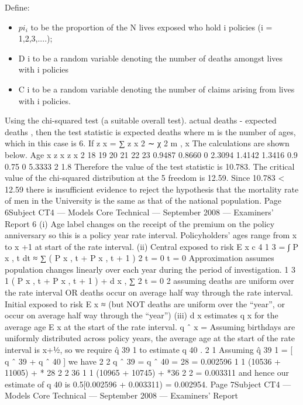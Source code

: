 \documentclass[a4paper,12pt]{article}
\begin{document}
\begin{enumerate}
Define:
\begin{itemize}
\item $pi_i$ to be the proportion of the N lives exposed who hold i policies (i = 1,2,3,....);
\item D i to be a random variable denoting the number of deaths amongst lives with i
policies
\item C i to be a random variable denoting the number of claims arising from lives with i
policies.
\end{itemize}
Using the chi-squared test (a suitable overall test).
actual deaths - expected deaths
, then the test statistic is
expected deaths
where m is the number of ages, which in this case is 6.
If z x =
∑ z x 2 ∼ χ 2 m ,
x
The calculations are shown below.
Age x z x z x 2
18
19
20
21
22
23 0.9487
0.8660
0
2.3094
1.4142
1.3416 0.9
0.75
0
5.3333
2
1.8
Therefore the value of the test statistic is 10.783.
The critical value of the chi-squared distribution
at the 5%
freedom is 12.59.
Since 10.783 < 12.59 there is insufficient evidence to reject
the hypothesis that the mortality rate of men in the University is the same as that of
the national population.
Page 6Subject CT4 — Models Core Technical — September 2008 — Examiners’ Report
6
(i)
Age label changes on the receipt of the
premium on the policy anniversary so this is a
policy year rate interval.
Policyholders’ ages range from x to x +1
at start of the rate interval.
(ii)
Central exposed to risk
E x c
4
1 3
= ∫ P x , t dt ≈ ∑ ( P x , t + P x , t + 1 )
2 t = 0
t = 0
Approximation assumes population changes linearly over each year
during the period of investigation.
1 3
1
( P x , t + P x , t + 1 ) + d x ,
∑
2 t = 0
2
assuming deaths are uniform over the rate interval OR deaths occur on
average half way through the rate interval.
Initial exposed to risk E x ≈
(but NOT deaths are uniform over the “year”, or occur on average half
way through the “year”)
(iii)
d x
estimates q x for the average age
E x
at the start of the rate interval.
q ˆ x =
Assuming birthdays are uniformly distributed
across policy years,
the average age at the start of the rate interval
is x+1⁄2, so we require q̂ 39 1 to estimate q 40 .
2
1
Assuming q̂ 39 1 = [ q ˆ 39 + q ˆ 40 ] we have
2
2
q ˆ 39 =
q ˆ 40 =
28
= 0.002596
1
1
(10536 + 11005) + * 28
2
2
36
1
1
(10965 + 10745) + *36
2
2
= 0.003311
and hence our estimate of q 40 is 0.5[0.002596 + 0.003311) = 0.002954.
Page 7Subject CT4 — Models Core Technical — September 2008 — Examiners’ Report

\end{enumerate}
\end{document}
